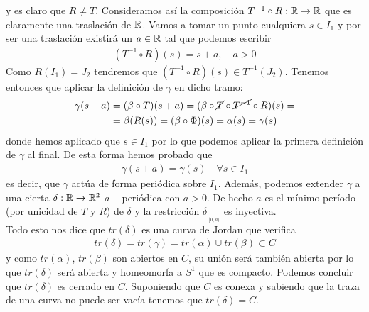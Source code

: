 \begin{observacion}
\begin{enumerate}
\begin{figure}[H]
%
        \end{figure}
        y es claro que $R\neq T$. Consideramos así la composición $T^{-1} \circ R : \mathbb{R} \to \mathbb{R}$ que es claramente una traslación de $\mathbb{R}$. Vamos a tomar un punto cualquiera $s\in I_1$ y por ser una traslación existirá un $a\in \mathbb{R}$ tal que podemos escribir
        \begin{gather*}
            (T^{-1} \circ R)(s) = s + a,\quad a>0
        \end{gather*}
        Como $R(I_1) = J_2$ tendremos que $(T^{-1} \circ R)(s)\in T^{-1}(J_2)$. Tenemos entonces que aplicar la definición de $\gamma$ en dicho tramo:
        \begin{align*}
            \gamma(s+a) &= (\beta \circ T) (s + a) = (\beta \circ\cancel{T} \circ \cancel{T^{-1}} \circ R) (s) = \\
            &= \beta(R(s)) = (\beta \circ \Phi)(s) = \alpha(s) = \gamma(s)
        \end{align*}
        donde hemos aplicado que $s\in I_1$ por lo que podemos aplicar la primera definición de $\gamma$ al final. De esta forma hemos probado que
        \begin{gather*}
            \gamma(s+a) = \gamma(s) \quad \forall s \in I_1
        \end{gather*}
        es decir, que $\gamma$ actúa de forma periódica sobre $I_1$. Además, podemos extender $\gamma$ a una cierta $\delta : \mathbb{R} \to \mathbb{R}^2$ $a-$periódica con $a>0$. De hecho $a$ es el mínimo período (por unicidad de $T$ y $R$) de $\delta$ y la restricción $\delta_{|_{[0,a)}}$ es inyectiva.\\

        Todo esto nos dice que $tr(\delta)$ es una curva de Jordan que verifica
        \begin{gather*}
            tr(\delta) = tr(\gamma) = tr(\alpha) \cup tr(\beta) \subset C
        \end{gather*}
        y como $tr(\alpha)$, $tr(\beta)$ son abiertos en $C$, su unión será también abierta por lo que $tr(\delta)$ será abierta y homeomorfa a $S^1$ que es compacto. Podemos concluir que $tr(\delta)$ es cerrado en $C$. Suponiendo que $C$ es conexa y sabiendo que la traza de una curva no puede ser vacía tenemos que $tr(\delta)=C$.\\


\end{enumerate}
\end{observacion}
